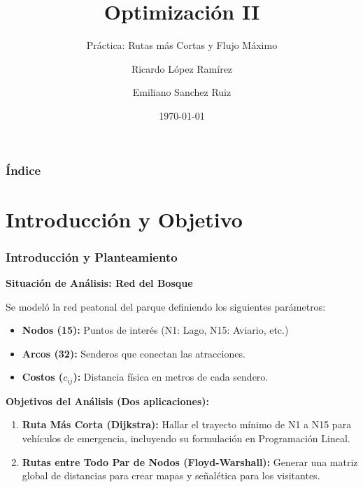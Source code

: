 \documentclass[aspectratio=169]{beamer}
\title{Optimización II}
\subtitle{Práctica: Rutas más Cortas y Flujo Máximo}
\author{Ricardo López Ramírez \and Emiliano Sanchez Ruiz}
\date{\today}
\institute{\url{acatlan.unam.com.mx}}
\begin{document}
\begin{frame}[plain,t]
    \titlepage
\end{frame}

\begin{frame}
    \frametitle{Índice}
    \tableofcontents
\end{frame}


\section{Introducción y Objetivo}

\begin{frame}
    \frametitle{Introducción y Planteamiento}
    \textbf{Situación de Análisis: Red del Bosque}
  
    Se modeló la red peatonal del parque definiendo los siguientes parámetros:
    \begin{itemize}
        \item \textbf{Nodos (15):} Puntos de interés (N1: Lago, N15: Aviario, etc.)
        \item \textbf{Arcos (32):} Senderos que conectan las atracciones.
        \item \textbf{Costos ($c_{ij}$):} Distancia física en metros de cada sendero.
    \end{itemize}
    \vspace{0.2cm}
    \textbf{Objetivos del Análisis (Dos aplicaciones):}
    \begin{enumerate}
        \item \textbf{Ruta Más Corta (Dijkstra):} Hallar el trayecto mínimo de N1 a N15 para vehículos de emergencia, incluyendo su formulación en Programación Lineal.
        \item \textbf{Rutas entre Todo Par de Nodos (Floyd-Warshall):} Generar una matriz global de distancias para crear mapas y señalética para los visitantes.
    \end{enumerate}
\end{frame}
\end{document}
